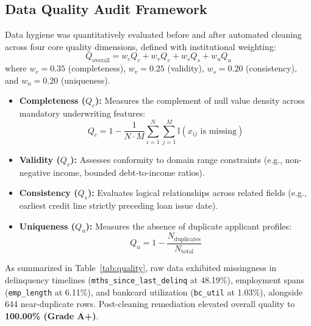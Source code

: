 \documentclass[conference]{IEEEtran}
\begin{document}
\subsection{Data Quality Audit Framework}
Data hygiene was quantitatively evaluated before and after automated cleaning across four core quality dimensions, defined with institutional weighting:
\begin{equation}
Q_{\text{overall}} = w_c Q_c + w_v Q_v + w_s Q_s + w_u Q_u
\end{equation}
where $w_c = 0.35$ (completeness), $w_v = 0.25$ (validity), $w_s = 0.20$ (consistency), and $w_u = 0.20$ (uniqueness).
\begin{itemize}
    \item \textbf{Completeness ($Q_c$):} Measures the complement of null value density across mandatory underwriting features:
    \begin{equation}
    Q_c = 1 - \frac{1}{N \cdot M} \sum_{i=1}^N \sum_{j=1}^M \mathbb{I}(x_{ij} \text{ is missing})
    \end{equation}
    \item \textbf{Validity ($Q_v$):} Assesses conformity to domain range constraints (e.g., non-negative income, bounded debt-to-income ratios).
    \item \textbf{Consistency ($Q_s$):} Evaluates logical relationships across related fields (e.g., earliest credit line strictly preceding loan issue date).
    \item \textbf{Uniqueness ($Q_u$):} Measures the absence of duplicate applicant profiles:
    \begin{equation}
    Q_u = 1 - \frac{N_{\text{duplicates}}}{N_{\text{total}}}
    \end{equation}
\end{itemize}

As summarized in Table~\ref{tab:quality}, raw data exhibited missingness in delinquency timelines (\texttt{mths\_since\_last\_delinq} at 48.19\%), employment spans (\texttt{emp\_length} at 6.11\%), and bankcard utilization (\texttt{bc\_util} at 1.03\%), alongside 644 near-duplicate rows. Post-cleaning remediation elevated overall quality to \textbf{100.00\% (Grade A+)}.
\end{document}
